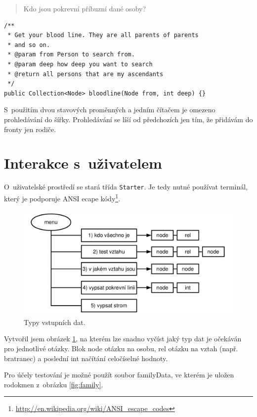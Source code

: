 \documentclass[a4paper, 12pt]{article}
\begin{document}
\begin{quote}
Kdo jsou pokrevní příbuzní dané osoby?
\end{quote}

\begin{verbatim}
/**
 * Get your blood line. They are all parents of parents
 * and so on.
 * @param from Person to search from.
 * @param deep how deep you want to search
 * @return all persons that are my ascendants
 */
public Collection<Node> bloodline(Node from, int deep) {}
\end{verbatim}

S~použitím dvou stavových proměnných a jedním čítačem
je omezeno prohledávání do šířky. Prohledávání se líší od
předchozích jen tím, že přidávám do fronty jen rodiče.

\section{Interakce s~uživatelem}\label{sec:int}
O~uživatelské prostředí se stará třída \texttt{Starter}.
Je tedy nutné používat terminál,
který je podporuje ANSI ecape kódy\footnote{\url{http://en.wikipedia.org/wiki/ANSI_escape_codes}}.

\begin{figure}
\centering
\includegraphics[width=\textwidth]{menu}
\caption{Typy vstupních dat.}
\label{fig:input}
\end{figure}

Vytvořil jsem obrázek \ref{fig:input}, na kterém lze snadno vyčíst
jaký typ dat je očekáván pro jednotlivé otázky. Blok \textsf{node}
otázku na osobu, \textsf{rel} otázku na vztah (např. bratranec)
a poslední \textsf{int} načítání celočíselné hodnoty.

Pro účely testování je možné použít soubor \textsf{familyData},
ve kterém je uložen rodokmen z~obrázku \ref{fig:family}.
\end{document}
